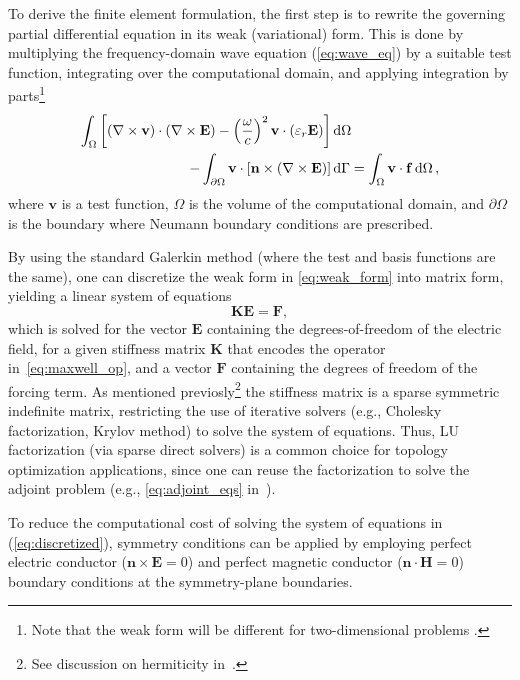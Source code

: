  To derive the finite element formulation, the first step is to rewrite the governing partial differential equation in its weak (variational) form. This is done by multiplying the frequency-domain wave equation (\eqref{eq:wave_eq}) by a suitable test function, integrating over the computational domain, and applying integration by parts\footnote{Note that the weak form will be different for two-dimensional problems \cite{ownpub0, ownpub2}.}
    \begin{align}\label{eq:weak_form}
        \int_\Omega \left[ \left( \nabla \times \mathbf{v} \right) \cdot \left( \nabla \times \mathbf{E} \right)- \left(\frac{\omega}{c}\right)^2 \mathbf{v}\cdot(\varepsilon_r \mathbf{E})\right]& \mathop{}\!\text{d} \Omega \nonumber \\ 
 - \int_{\partial \Omega} \mathbf{v} \cdot \left[ \mathbf{n} \times \left( \nabla \times \mathbf{E} \right) \right]& \mathop{}\!\text{d} \Gamma 
 = \int_\Omega \mathbf{v} \cdot \mathbf{f} \mathop{}\!\text{d} \Omega\,,
    \end{align}
 where $\mathbf{v}$ is a test function, $\Omega$ is the volume of the computational domain,
 and $\partial \Omega$ is the boundary where Neumann boundary conditions
 are prescribed. 
 
 By using
 the standard Galerkin method (where the test and basis functions are the same),
 one can discretize the weak form in \eqref{eq:weak_form} 
 into matrix form, yielding a linear system of equations
    \begin{equation}\label{eq:discretized}
 \mathbf{K} \mathbf{E} = \mathbf{F},
    \end{equation}
 which is solved for the vector $\mathbf{E}$ containing the degrees-of-freedom of the electric field, for a given stiffness matrix $\mathbf{K}$ that encodes the operator 
 in~\eqref{eq:maxwell_op}, and a 
 vector $\mathbf{F}$ containing the degrees of freedom of the forcing term. 
 As mentioned previosly\footnote{See discussion on hermiticity
 in~.} the stiffness matrix is a sparse symmetric indefinite matrix,
 restricting the use of iterative solvers
 (e.g., Cholesky factorization, Krylov method) to solve the system of equations.
 Thus, LU factorization (via sparse direct solvers) is
 a common choice for topology optimization applications, since one can reuse the factorization to solve
 the adjoint problem (e.g., \eqref{eq:adjoint_eqs} in~). 
 
 To reduce the computational cost of solving the system of equations in (\eqref{eq:discretized}), symmetry conditions can be applied by employing perfect electric conductor ($\mathbf{n} \times \mathbf{E}=0$) and perfect
 magnetic
 conductor ($\mathbf{n} \cdot \mathbf{H}=0$) boundary conditions at the symmetry-plane boundaries.

